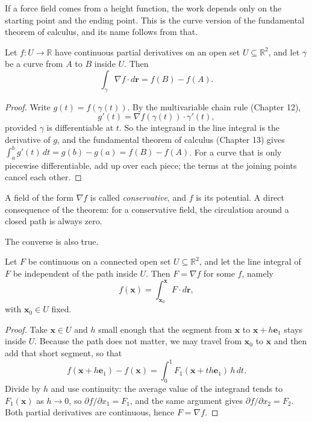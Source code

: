 If a force field comes from a height function, the work depends only
on the starting point and the ending point. This is the curve version of the fundamental theorem of calculus,
and its name follows from that.

\begin{teorema}
 Let $f\colon U\to\mathbb{R}$ have continuous partial
derivatives on an open set $U\subseteq\mathbb{R}^{2}$, and let $\gamma$
be a curve from $A$ to $B$ inside $U$. Then
\[
\int_{\gamma}\nabla f\cdot d\mathbf{r}=f(B)-f(A).
\]
\end{teorema}

\begin{proof}
Write $g(t)=f(\gamma(t))$. By the multivariable chain rule (Chapter 12),
\[
g'(t)=\nabla f(\gamma(t))\cdot\gamma'(t),
\]
provided $\gamma$ is differentiable at $t$. So the integrand in the line integral
is the derivative of $g$, and the fundamental theorem of calculus (Chapter 13) gives
$\int_{a}^{b}g'(t)\,dt=g(b)-g(a)=f(B)-f(A)$. For a curve that is only
piecewise differentiable, add up over each piece; the terms at the joining
points cancel each other.
\end{proof}

A field of the form $\nabla f$ is called \emph{conservative}, and $f$ is its potential.
A direct consequence of the theorem: for a conservative field, the circulation around
a closed path is always zero.

The converse is also true.

\begin{teorema}[Converse]
Let $F$ be continuous on a connected open set
$U\subseteq\mathbb{R}^{2}$, and let the line integral of $F$ be independent of the
path inside $U$. Then $F=\nabla f$ for some $f$, namely
\[
f(\mathbf{x})=\int_{\mathbf{x}_{0}}^{\mathbf{x}}F\cdot d\mathbf{r},
\]
with $\mathbf{x}_{0}\in U$ fixed.
\end{teorema}

\begin{proof}
Take $\mathbf{x}\in U$ and $h$ small enough that the segment from $\mathbf{x}$ to
$\mathbf{x}+h\mathbf{e}_{1}$ stays inside $U$. Because the path does not
matter, we may travel from $\mathbf{x}_{0}$ to $\mathbf{x}$ and then
add that short segment, so that
\[
f(\mathbf{x}+h\mathbf{e}_{1})-f(\mathbf{x})
=\int_{0}^{1}F_{1}(\mathbf{x}+th\mathbf{e}_{1})\,h\,dt .
\]
Divide by $h$ and use continuity: the average value of the integrand tends to
$F_{1}(\mathbf{x})$ as $h\to0$, so $\partial f/\partial x_{1}=F_{1}$,
and the same argument gives $\partial f/\partial x_{2}=F_{2}$. Both partial
derivatives are continuous, hence $F=\nabla f$.
\end{proof}

